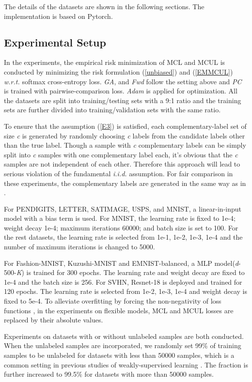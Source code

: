\documentclass[]{article} \usepackage{geometry}
\begin{document}
The details of the datasets are shown in the following sections. The implementation is based on Pytorch.
\subsection{Experimental Setup}
In the experiments, the empirical risk minimization of MCL and MCUL is conducted by minimizing the risk formulation (\ref{unbiased}) and (\ref{EMMCUL}) \textit{w.r.t.} softmax cross-entropy loss. \textit{GA}, and \textit{Fwd} follow the setting above and \textit{PC} is trained with pairwise-comparison loss. \textit{Adam} \cite{Adam} is applied for optimization. All the datasets are split into training/testing sets with a 9:1 ratio and the training sets are further divided into training/validation sets with the same ratio.

To ensure that the assumption (\ref{E3}) is satisfied, each complementary-label set of size \textit{c} is generated by randomly choosing \textit{c} labels from the candidate labels other than the true label. Though a sample with \textit{c} complementary labels can  be simply split into \textit{c} samples with one complementary label each, it's obvious that the \textit{c} samples are not independent of each other. Therefore this approach will lead to serious violation of the fundamental \textit{i.i.d.} assumption. For fair comparison in these experiments, the complementary labels are generated in the same way as in \cite{DBLP:conf/icml/IshidaNMS19}.

For PENDIGITS, LETTER, SATIMAGE, USPS, and MNIST, a linear-in-input model with a bias term is used. For MNIST, the learning rate is fixed to 1e-4; weight decay 1e-4; maximum iterations 60000; and batch size is set to 100. For the rest datasets, the learning rate is selected from 1e-1, 1e-2, 1e-3, 1e-4 and the number of maximum iterations is changed to 5000.

For Fashion-MNIST, Kuzushi-MNIST and EMNIST-balanced, a MLP model(\textit{d}-500-\textit{K}) is trained for 300 epochs. The learning rate and weight decay are fixed to 1e-4 and the batch size is 256. For SVHN, Resnet-18 \cite{resnet} is deployed and trained for 120 epochs. The learning rate is selected from 1e-2, 1e-3, 1e-4 and weight decay is fixed to 5e-4. To alleviate overfitting by forcing the non-negativity of loss functions \cite{nn}, in the experiments on flexible models, MCL and MCUL losses are replaced by their absolute values.

Experiments on datasets with or without unlabeled samples are both conducted. When the unlabeled samples are incorporated, we randomly set 99\% of training samples to be unlabeled for datasets with less than 50000 samples, which is a common setting in previous studies of weakly-supervised learning \cite{DBLP:conf/icml/SakaiPNS17,nn}. The fraction is further increased to 99.5\% for datasets with more than 50000 samples.
\end{document}
